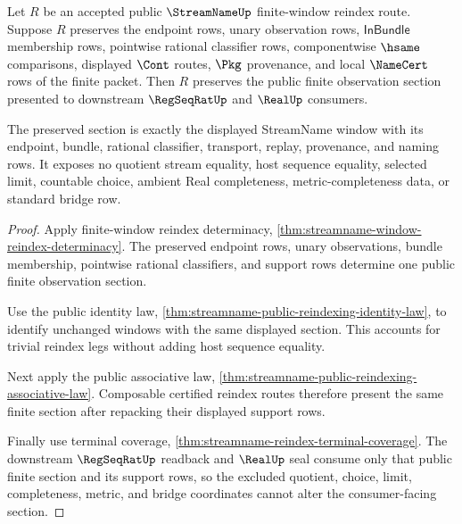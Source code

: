 \begin{theorem}
\label{thm:streamname-finite-window-reindex-stability}
Let $R$ be an accepted public $\StreamNameUp$ finite-window reindex route. Suppose $R$ preserves the endpoint rows, unary observation rows, $\mathsf{InBundle}$ membership rows, pointwise rational classifier rows, componentwise $\hsame$ comparisons, displayed $\Cont$ routes, $\Pkg$ provenance, and local $\NameCert$ rows of the finite packet. Then $R$ preserves the public finite observation section presented to downstream $\RegSeqRatUp$ and $\RealUp$ consumers.

The preserved section is exactly the displayed StreamName window with its endpoint, bundle, rational classifier, transport, replay, provenance, and naming rows. It exposes no quotient stream equality, host sequence equality, selected limit, countable choice, ambient Real completeness, metric-completeness data, or standard bridge row.
\end{theorem}
\begin{proof}
Apply finite-window reindex determinacy, \autoref{thm:streamname-window-reindex-determinacy}. The preserved endpoint rows, unary observations, bundle membership, pointwise rational classifiers, and support rows determine one public finite observation section.

Use the public identity law, \autoref{thm:streamname-public-reindexing-identity-law}, to identify unchanged windows with the same displayed section. This accounts for trivial reindex legs without adding host sequence equality.

Next apply the public associative law, \autoref{thm:streamname-public-reindexing-associative-law}. Composable certified reindex routes therefore present the same finite section after repacking their displayed support rows.

Finally use terminal coverage, \autoref{thm:streamname-reindex-terminal-coverage}. The downstream $\RegSeqRatUp$ readback and $\RealUp$ seal consume only that public finite section and its support rows, so the excluded quotient, choice, limit, completeness, metric, and bridge coordinates cannot alter the consumer-facing section.
\end{proof}


